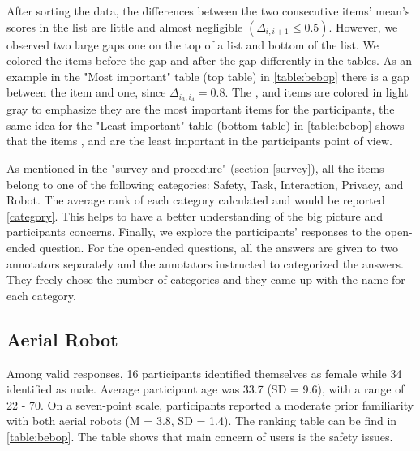 \documentclass[letterpaper, 10 pt, conference]{ieeeconf}  %
\begin{document}
After sorting the data, the differences between the two consecutive items' mean's scores in the list are little and almost negligible $(\Delta_{i,i+1} \leqslant 0.5)$. However, we observed two large gaps one on the top of a list and bottom of the list. We colored the items before the gap and after the gap differently in the tables. As an example in the "Most important" table (top table) in \ref{table:bebop} there is a gap between the  item and  one, since $\Delta_{i_3,i_4} = 0.8 $. The ,  and  items are colored in light gray to emphasize they are the most important items for the participants, the same idea for the "Least important" table (bottom table) in \ref{table:bebop} shows that the items ,  and  are the least important in the participants point of view.

As mentioned in the "survey and procedure" (section \ref{survey}), all the items belong to one of the following categories: Safety, Task, Interaction, Privacy, and Robot. The average rank of each category calculated and would be reported \ref{category}. This helps to have a better understanding of the big picture and participants concerns. Finally, we explore the participants' responses to the open-ended question. For the open-ended questions, all the answers are given to two annotators separately and the annotators instructed to categorized the answers. They freely chose the number of categories and they came up with the name for each category.  


\mydata



\subsection{Aerial Robot}
Among valid responses, 16 participants identified themselves as female while 34 identified as male. Average participant age was 33.7 (SD = 9.6), with a range of 22 - 70. On a seven-point scale, participants reported a moderate prior familiarity with both aerial robots (M = 3.8, SD = 1.4). The ranking table can be find in \ref{table:bebop}. The table shows that main concern of users is the safety issues. 
\end{document}
